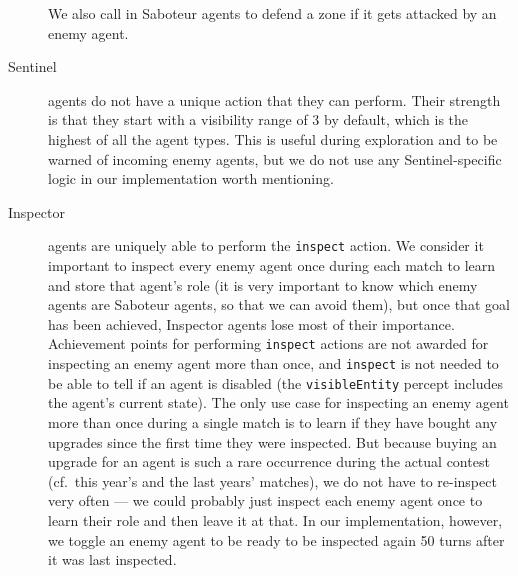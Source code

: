 \begin{description}
        We also call in Saboteur agents to defend a zone if it gets attacked by an enemy agent.
    \item[Sentinel] agents do not have a unique action that they can perform.
        Their strength is that they start with a visibility range of 3 by default, which is the highest of all the agent types.
        This is useful during exploration and to be warned of incoming enemy agents, but we do not use any Sentinel-specific logic in our implementation worth mentioning.
    \item[Inspector] agents are uniquely able to perform the \texttt{inspect} action.
        We consider it important to inspect every enemy agent once during each match to learn and store that agent's role (it is very important to know which enemy agents are Saboteur agents, so that we can avoid them), but once that goal has been achieved, Inspector agents lose most of their importance.
        Achievement points for performing \texttt{inspect} actions are not awarded for inspecting an enemy agent more than once, and \texttt{inspect} is not needed to be able to tell if an agent is disabled (the \texttt{visibleEntity} percept includes the agent's current state).
        The only use case for inspecting an enemy agent more than once during a single match is to learn if they have bought any upgrades since the first time they were inspected.
        But because buying an upgrade for an agent is such a rare occurrence during the actual contest (cf.\ this year's and the last years' matches), we do not have to re-inspect very often --- we could probably just inspect each enemy agent once to learn their role and then leave it at that.
        In our implementation, however, we toggle an enemy agent to be ready to be inspected again 50 turns after it was last inspected.
\end{description}
